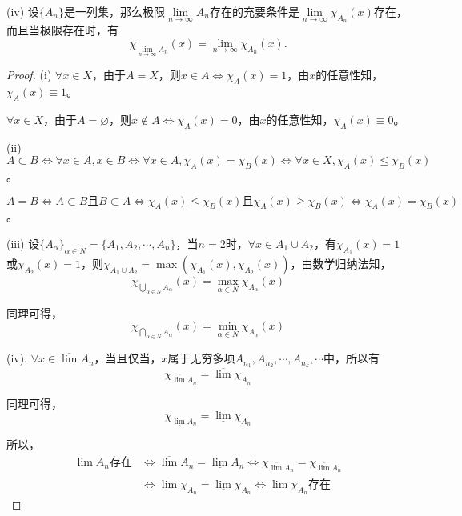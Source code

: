 \documentclass[12pt, a4paper, oneside]{ctexart}
\begin{document}
(iv) 设$\{A_n\}$是一列集，那么极限$\lim\limits_{n\rightarrow\infty}A_n$存在的充要条件是$\lim\limits_{n\rightarrow\infty}\chi_{A_n}(x)$存在，而且当极限存在时，有
\begin{equation*}
    \chi_{\lim\limits_{n\rightarrow\infty}A_n}(x) = \lim_{n\rightarrow \infty}\chi_{A_n}(x).
\end{equation*}
\begin{proof}
    (i) $\forall x\in X$，由于$A=X$，则$x\in A\iff \chi_A(x) = 1$，由$x$的任意性知，$\chi_A(x)\equiv 1$。

    $\forall x\in X$，由于$A=\varnothing$，则$x\notin A\iff \chi_A(x) = 0$，由$x$的任意性知，$\chi_A(x)\equiv 0$。

    (ii) $A\subset B\iff\forall x\in A, x\in B\iff \forall x\in A, \chi_A(x)= \chi_B(x)\iff\forall x\in X, \chi_A(x)\leqslant \chi_B(x)$。

    $A=B\iff A\subset B \text{且} B\subset A\iff \chi_A(x)\leqslant \chi_B(x) \text{且} \chi_A(x)\geqslant \chi_B(x)\iff \chi_A(x)=\chi_B(x)$。

    (iii) 设$\{A_\alpha\}_{\alpha\in N}=\{A_1,A_2,\cdots,A_n\}$，当$n=2$时，$\forall x\in A_1\cup A_2$，有$\chi_{A_1}(x)=1$或$\chi_{A_2}(x)=1$，则$\chi_{A_1\cup A_2} = \max(\chi_{A_1}(x), \chi_{A_2}(x))$，由数学归纳法知，
    \begin{equation*}
        \chi_{\bigcup\limits_{\alpha\in N}A_{\alpha}}(x) = \max\limits_{\alpha\in N}\chi_{A_{\alpha}}(x)
    \end{equation*}

    同理可得，
    \begin{equation*}
        \chi_{\bigcap\limits_{\alpha\in N}A_{\alpha}}(x) = \min\limits_{\alpha\in N}\chi_{A_{\alpha}}(x)
    \end{equation*}

    (iv). $\forall x\in \overline{\lim}A_n$，当且仅当，$x$属于无穷多项$A_{n_1},A_{n_2},\cdots,A_{n_k},\cdots$中，所以有
    \begin{equation*}
        \chi_{\overline{\lim}A_n}=\overline{\lim}\chi_{A_n}
    \end{equation*}

    同理可得，
    \begin{equation*}
        \chi_{\underline{\lim}A_n}=\underline{\lim}\chi_{A_n}
    \end{equation*}

    所以，
    \begin{equation*}
        \begin{aligned}
        \lim A_n\text{存在}&\iff \overline{\lim}A_n=\underline{\lim}A_n\iff \chi_{\overline{\lim}A_n}=\chi_{\overline{\lim}A_n}\\
        &\iff\overline{\lim}\chi_{A_n}=\underline{\lim}\chi_{A_n}\iff\lim\chi_{A_n}\text{存在}
        \end{aligned}
    \end{equation*}


\end{proof}
\end{document}
